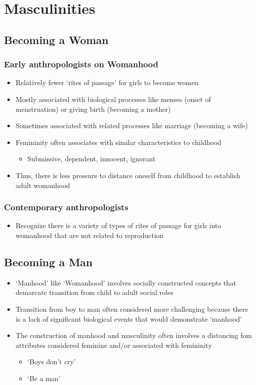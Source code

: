 \documentclass[a4paper]{article}
\begin{document}
\section{Masculinities} %
\subsection{Becoming a Woman}
\subsubsection{Early anthropologists on Womanhood}
\begin{itemize}
  \item Relatively fewer `rites of passage' for girls to become women
  \item Mostly associated with biological processes like menses (onset of menstruation) or giving birth (becoming a mother)
  \item Sometimes associated with related processes like marriage (becoming a wife)
  \item Femininity often associates with similar characteristics to childhood \begin{itemize}
    \item Submissive, dependent, innocent, ignorant
  \end{itemize}
  \item Thus, there is less pressure to distance oneself from childhood to establish adult womanhood
\end{itemize}

\subsubsection{Contemporary anthropologists}
\begin{itemize}
  \item Recognize there is a variety of types of rites of passage for girls into womanhood that are not related to reproduction
\end{itemize}

\subsection{Becoming a Man}
\begin{itemize}
  \item `Manhood' like `Womanhood' involves socially constructed concepts that demarcate transition from child to adult social roles
  \item Transition from boy to man often considered more challenging because there is a lack of significant biological events that would demonstrate `manhood'
  \item The construction of manhood and masculinity often involves a distancing fom attributes considered feminine and/or associated with femininity
  \begin{itemize}
    \item `Boys don't cry'
    \item `Be a man'
  \end{itemize}
\end{itemize}
\end{document}
